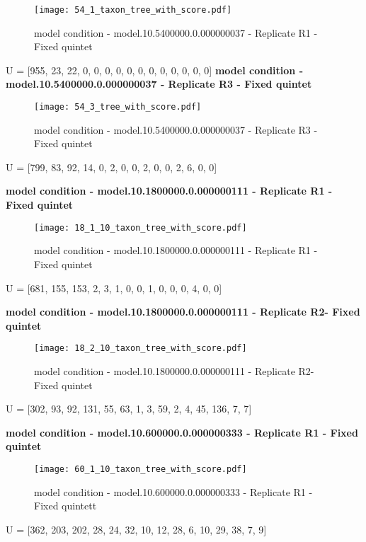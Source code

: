 \documentclass[letterpaper, 12pt]{article}
\begin{document}
\begin{figure}[h]
  \centering
  \texttt{[image: 54\_1\_taxon\_tree\_with\_score.pdf]}
  \caption{model condition - model.10.5400000.0.000000037 - Replicate R1 - Fixed quintet}
\end{figure}

 U = [955, 23, 22, 0, 0, 0, 0, 0, 0, 0, 0, 0, 0, 0, 0]
 \clearpage
  {\bf  model condition - model.10.5400000.0.000000037 - Replicate R3 - Fixed quintet } \\
 
\begin{figure}[h]
  \centering
  \texttt{[image: 54\_3\_tree\_with\_score.pdf]}
  \caption{model condition - model.10.5400000.0.000000037 - Replicate R3 - Fixed quintet}
\end{figure}

 
 
 U = [799, 83, 92, 14, 0, 2, 0, 0, 2, 0, 0, 2, 6, 0, 0]

 \clearpage
  {\bf  model condition - model.10.1800000.0.000000111 - Replicate R1 - Fixed quintet } \\
 

\begin{figure}[h]
  \centering
  \texttt{[image: 18\_1\_10\_taxon\_tree\_with\_score.pdf]}
  \caption{model condition - model.10.1800000.0.000000111 - Replicate R1 - Fixed quintet}
\end{figure}


 U = [681, 155, 153, 2, 3, 1, 0, 0, 1, 0, 0, 0, 4, 0, 0]

 \clearpage
  {\bf  model condition - model.10.1800000.0.000000111 - Replicate R2- Fixed quintet } \\
 
\begin{figure}[h]
  \centering
  \texttt{[image: 18\_2\_10\_taxon\_tree\_with\_score.pdf]}
  \caption{model condition - model.10.1800000.0.000000111 - Replicate R2- Fixed quintet}
\end{figure}
 
 U = [302, 93, 92, 131, 55, 63, 1, 3, 59, 2, 4, 45, 136, 7, 7]
 
   
  \clearpage
  {\bf  model condition - model.10.600000.0.000000333 - Replicate R1 - Fixed quintet } \\
 
\begin{figure}[h]
  \centering
  \texttt{[image: 60\_1\_10\_taxon\_tree\_with\_score.pdf]}
  \caption{model condition - model.10.600000.0.000000333 - Replicate R1 - Fixed quintett}
\end{figure}
 
 U = [362, 203, 202, 28, 24, 32, 10, 12, 28, 6, 10, 29, 38, 7, 9]


 
\end{document}
